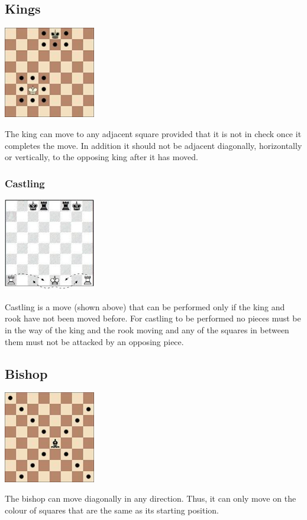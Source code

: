 \documentclass[]{report}
\begin{document}
\subsection{Kings}
\begin{center}
	\includegraphics[width=0.3\textwidth]{images/boards/king_movement}
\end{center}
The king can move to any adjacent square provided that it is not in check once it completes the move. In addition it should not be adjacent diagonally, horizontally or vertically, to the opposing king after it has moved. 
\subsubsection{Castling}
\begin{center}
	\includegraphics[width=0.3\textwidth]{images/boards/castling}
\end{center}
Castling is a move (shown above) that can be performed only if the king and rook have not been moved before. For castling to be performed no pieces must be in the way of the king and the rook moving and any of the squares in between them must not be attacked by an opposing piece.
\subsection{Bishop}
\begin{center}
	\includegraphics[width=0.3\textwidth]{images/boards/bishop_movement}
\end{center}
The bishop can move diagonally in any direction. Thus, it can only move on the colour of squares that are the same as its starting position.	
\end{document}
